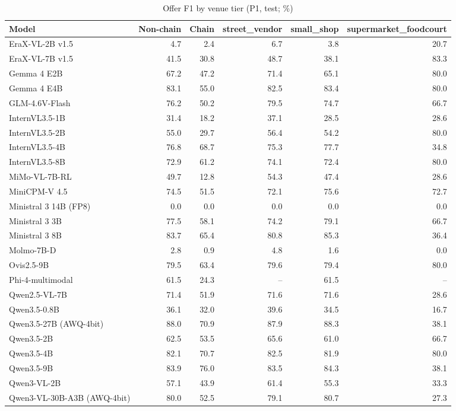 \begin{table}[t]
\centering
\caption{Offer F1 by venue tier (P1, test; \%)}
\label{tab:venue_results}
\small
\begin{tabular}{lrrrrr}
\toprule
Model & Non-chain & Chain & street\_vendor & small\_shop & supermarket\_foodcourt \\
\midrule
EraX-VL-2B v1.5 & 4.7 & 2.4 & 6.7 & 3.8 & 20.7 \\
EraX-VL-7B v1.5 & 41.5 & 30.8 & 48.7 & 38.1 & 83.3 \\
Gemma 4 E2B & 67.2 & 47.2 & 71.4 & 65.1 & 80.0 \\
Gemma 4 E4B & 83.1 & 55.0 & 82.5 & 83.4 & 80.0 \\
GLM-4.6V-Flash & 76.2 & 50.2 & 79.5 & 74.7 & 66.7 \\
InternVL3.5-1B & 31.4 & 18.2 & 37.1 & 28.5 & 28.6 \\
InternVL3.5-2B & 55.0 & 29.7 & 56.4 & 54.2 & 80.0 \\
InternVL3.5-4B & 76.8 & 68.7 & 75.3 & 77.7 & 34.8 \\
InternVL3.5-8B & 72.9 & 61.2 & 74.1 & 72.4 & 80.0 \\
MiMo-VL-7B-RL & 49.7 & 12.8 & 54.3 & 47.4 & 28.6 \\
MiniCPM-V 4.5 & 74.5 & 51.5 & 72.1 & 75.6 & 72.7 \\
Ministral 3 14B (FP8) & 0.0 & 0.0 & 0.0 & 0.0 & 0.0 \\
Ministral 3 3B & 77.5 & 58.1 & 74.2 & 79.1 & 66.7 \\
Ministral 3 8B & 83.7 & 65.4 & 80.8 & 85.3 & 36.4 \\
Molmo-7B-D & 2.8 & 0.9 & 4.8 & 1.6 & 0.0 \\
Ovis2.5-9B & 79.5 & 63.4 & 79.6 & 79.4 & 80.0 \\
Phi-4-multimodal & 61.5 & 24.3 & – & 61.5 & – \\
Qwen2.5-VL-7B & 71.4 & 51.9 & 71.6 & 71.6 & 28.6 \\
Qwen3.5-0.8B & 36.1 & 32.0 & 39.6 & 34.5 & 16.7 \\
Qwen3.5-27B (AWQ-4bit) & 88.0 & 70.9 & 87.9 & 88.3 & 38.1 \\
Qwen3.5-2B & 62.5 & 53.5 & 65.6 & 61.0 & 66.7 \\
Qwen3.5-4B & 82.1 & 70.7 & 82.5 & 81.9 & 80.0 \\
Qwen3.5-9B & 83.9 & 76.0 & 83.5 & 84.3 & 38.1 \\
Qwen3-VL-2B & 57.1 & 43.9 & 61.4 & 55.3 & 33.3 \\
Qwen3-VL-30B-A3B (AWQ-4bit) & 80.0 & 52.5 & 79.1 & 80.7 & 27.3 \\

\end{tabular}
\end{table}
